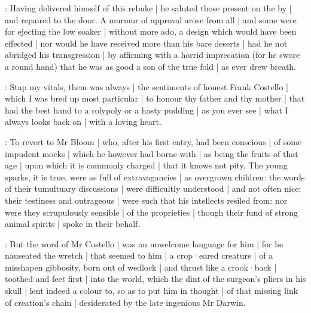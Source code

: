 :
Having delivered himself of this rebuke |
he saluted those present on the by |
and repaired to the door.
A murmur of approval arose from all |
and some were for ejecting the low soaker |
without more ado,
a design which would have been effected |
nor would he have received more than his bare deserts |
had he not abridged his transgression |
by affirming with a horrid imprecation
(for he swore a round hand)
that he was as good a son of the true fold |
as ever drew breath.

\punch:
Stap my vitals,
them was always |
the sentiments of honest Frank Costello |
which I was bred up most particular |
to honour thy father and thy mother |
that had the best hand to a rolypoly or a hasty pudding |
as you ever see |
what I always looks back on |
with a loving heart.



:
To revert to Mr Bloom |
who,
after his first entry,
had been conscious |
of some impudent mocks |
which he however had borne with |
as being the fruits of that age |
upon which it is commonly charged |
that it knows not pity.
The young sparks,
it is true,
were as full of extravagancies |
as overgrown children:
the words of their tumultuary discussions |
were difficultly understood |
and not often nice:
their testiness and outrageous  |
were such that his intellects resiled from:
nor were they scrupulously sensible |
of the proprieties |
though their fund of strong animal spirits |
spoke in their behalf.

:
But the word of Mr Costello |
was an unwelcome language for him |
for he nauseated the wretch |
that seemed to him |
a crop·eared creature |
of a misshapen gibbosity,
born out of wedlock |
and thrust like a crook·back |
toothed and feet first |
into the world,
which the dint of the surgeon's pliers in his skull |
lent indeed a colour to,
so as to put him in thought |
of that missing link of creation's chain |
desiderated by the late ingenious Mr Darwin.

